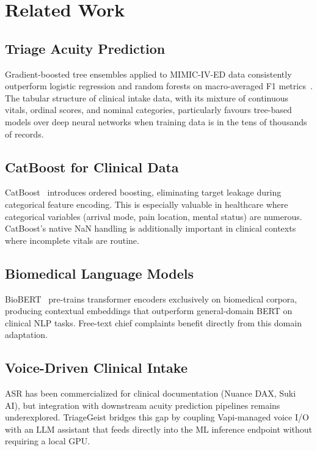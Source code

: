 \documentclass[conference]{IEEEtran}
\begin{document}
\section{Related Work}

\subsection{Triage Acuity Prediction}
Gradient-boosted tree ensembles applied to MIMIC-IV-ED data consistently outperform logistic regression and random forests on macro-averaged F1 metrics~\cite{hong2018}. The tabular structure of clinical intake data, with its mixture of continuous vitals, ordinal scores, and nominal categories, particularly favours tree-based models over deep neural networks when training data is in the tens of thousands of records.

\subsection{CatBoost for Clinical Data}
CatBoost~\cite{prokhorenkova2018} introduces ordered boosting, eliminating target leakage during categorical feature encoding. This is especially valuable in healthcare where categorical variables (arrival mode, pain location, mental status) are numerous. CatBoost's native NaN handling is additionally important in clinical contexts where incomplete vitals are routine.

\subsection{Biomedical Language Models}
BioBERT~\cite{lee2020} pre-trains transformer encoders exclusively on biomedical corpora, producing contextual embeddings that outperform general-domain BERT on clinical NLP tasks. Free-text chief complaints benefit directly from this domain adaptation.

\subsection{Voice-Driven Clinical Intake}
ASR has been commercialized for clinical documentation (Nuance DAX, Suki AI), but integration with downstream acuity prediction pipelines remains underexplored. TriageGeist bridges this gap by coupling Vapi-managed voice I/O with an LLM assistant that feeds directly into the ML inference endpoint without requiring a local GPU.
\end{document}
